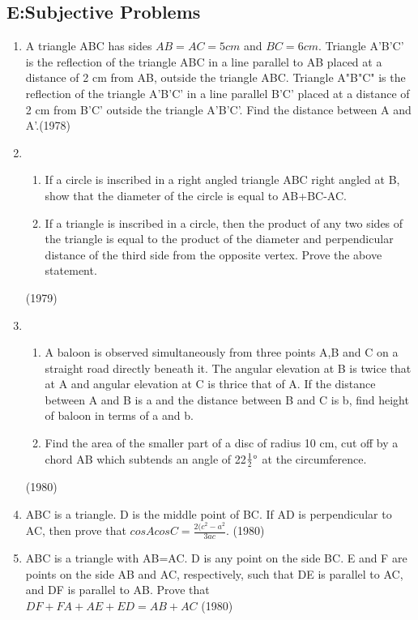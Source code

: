 \documentclass[journal,12pt,twocolumn]{IEEEtran}
\theoremstyle{remark}
\begin{document}
\subsection*{E:Subjective Problems}

\begin{enumerate}[label=\arabic*.]
    \item A triangle ABC has sides $AB=AC=5 cm$ and $BC =6 cm$. Triangle A'B'C' is the reflection of the triangle ABC in a line parallel to AB placed at a distance of 2 cm from AB, outside the triangle ABC. Triangle A"B"C" is the reflection of the triangle A'B'C' in a line parallel B'C' placed at a distance of 2 cm from B'C' outside the triangle A'B'C'. Find the distance between A and A'.\hfill {(1978)}
    \item 
    \begin{enumerate}[label=(\alph*)]
    \item If a circle is inscribed in a right angled triangle ABC right angled at B, show that the diameter of the circle is equal to AB+BC-AC.
    \item If a triangle is inscribed in a circle, then the product of any two sides of the triangle is equal to the product of the diameter and perpendicular distance of the third side from the opposite vertex. Prove the above statement.
    \end{enumerate}
    \hfill {(1979)}
    \item
    \begin{enumerate}[label=(\alph*)]
    \item A baloon is observed simultaneously from three points A,B and C on a straight road directly beneath it. The angular elevation at B is twice that at A and angular elevation at C is thrice that of A. If the distance between A and B is a and the distance between B and C is b, find height of baloon in terms of a and b.
    \item Find the area of the smaller part of a disc of radius 10 cm, cut off by a chord AB which subtends an angle of 22$\frac{1}{2} \degree$ at the circumference.
    \end{enumerate}
    \hfill {(1980)}
    \item ABC is a triangle. D is the middle point of BC. If AD is perpendicular to AC, then prove that $cosAcosC = \frac{2(c^{2}-a^{2}}{3ac}$.
    \hfill {(1980)}
    \item ABC is a triangle with AB=AC. D is any point on the side BC. E and F are points on the side AB and AC, respectively, such that DE is parallel to AC, and DF is parallel to AB. Prove that \\
    $DF + FA + AE + ED = AB+AC$
    \hfill {(1980)} 
\end{enumerate}
\end{document}
